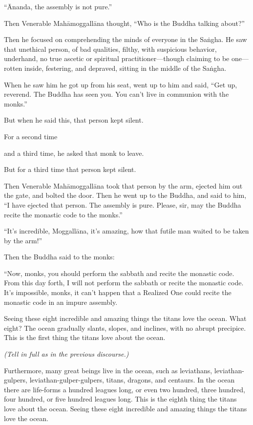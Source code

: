 \documentclass[12pt,openany]{book}%
\newcommand*{\scexpansioninstructions}[1]{\begin{small}\textit{#1}\end{small}}
\begin{document}
“Ānanda, the assembly is not pure.” 

Then Venerable \textsanskrit{Mahāmoggallāna} thought, “Who is the Buddha talking about?” 

Then he focused on comprehending the minds of everyone in the \textsanskrit{Saṅgha}. He saw that unethical person, of bad qualities, filthy, with suspicious behavior, underhand, no true ascetic or spiritual practitioner—though claiming to be one—rotten inside, festering, and depraved, sitting in the middle of the \textsanskrit{Saṅgha}. 

When he saw him he got up from his seat, went up to him and said, “Get up, reverend. The Buddha has seen you. You can’t live in communion with the monks.” 

But when he said this, that person kept silent. 

For a second time 

and a third time, he asked that monk to leave. 

But for a third time that person kept silent. 

Then Venerable \textsanskrit{Mahāmoggallāna} took that person by the arm, ejected him out the gate, and bolted the door. Then he went up to the Buddha, and said to him, “I have ejected that person. The assembly is pure. Please, sir, may the Buddha recite the monastic code to the monks.” 

“It’s incredible, \textsanskrit{Moggallāna}, it’s amazing, how that futile man waited to be taken by the arm!” 

Then the Buddha said to the monks: 

“Now, monks, you should perform the sabbath and recite the monastic code. From this day forth, I will not perform the sabbath or recite the monastic code. It’s impossible, monks, it can’t happen that a Realized One could recite the monastic code in an impure assembly. 

Seeing these eight incredible and amazing things the titans love the ocean. What eight? The ocean gradually slants, slopes, and inclines, with no abrupt precipice. This is the first thing the titans love about the ocean. 

\scexpansioninstructions{(Tell in full as in the previous discourse.) }

Furthermore, many great beings live in the ocean, such as leviathans, leviathan-gulpers, leviathan-gulper-gulpers, titans, dragons, and centaurs. In the ocean there are life-forms a hundred leagues long, or even two hundred, three hundred, four hundred, or five hundred leagues long. This is the eighth thing the titans love about the ocean. Seeing these eight incredible and amazing things the titans love the ocean. 
\end{document}
